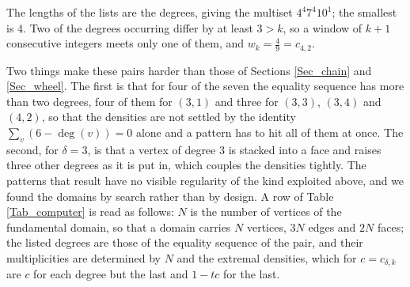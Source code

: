 \documentclass[10pt,a4paper]{article}
\begin{document}
\noindent The lengths of the lists are the degrees, giving the multiset $4^{4}7^{4}10^{1}$; the smallest is $4$. Two of the
degrees occurring differ by at least $3>k$, so a window of $k+1$ consecutive integers meets only one of
them, and $w_{k}=\tfrac{4}{9}=c_{4,2}$.


Two things make these pairs harder than those of Sections \ref{Sec_chain} and \ref{Sec_wheel}. The
first is that for four of the seven the equality sequence has more than two degrees, four of them for
$(3,1)$ and three for $(3,3)$, $(3,4)$ and $(4,2)$, so that the densities are not settled by the
identity $\sum_{v}(6-\deg (v))=0$ alone and a pattern has to hit all of them at once. The second,
for $\delta =3$, is that a vertex of degree $3$ is stacked into a face and raises three other degrees
as it is put in, which couples the densities tightly. The patterns that result have no visible
regularity of the kind exploited above, and we found the domains by search rather than by design. A
row of Table
\ref{Tab_computer} is read as follows: $N$ is the number of vertices of the fundamental domain, so
that a domain carries $N$ vertices, $3N$ edges and $2N$ faces; the listed degrees are those of the
equality sequence of the pair, and their multiplicities are determined by $N$ and the extremal
densities, which for $c=c_{\delta ,k}$ are $c$ for each degree but the last and $1-tc$ for the last.
\end{document}
